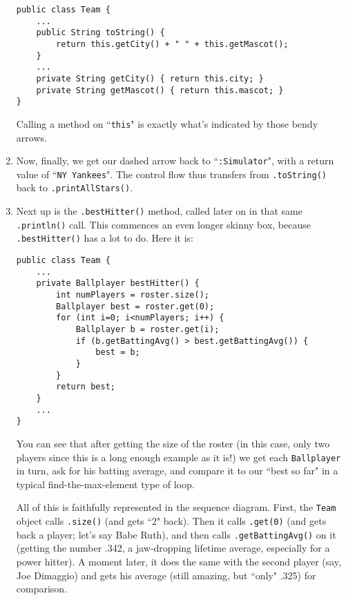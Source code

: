 \begin{enumerate}
\begin{Verbatim}[fontsize=\footnotesize,samepage=true,frame=single]
public class Team {
    ...
    public String toString() {
        return this.getCity() + " " + this.getMascot();
    }
    ...
    private String getCity() { return this.city; }
    private String getMascot() { return this.mascot; }
}
\end{Verbatim}

Calling a method on ``\texttt{this}" is exactly what's indicated by those
bendy arrows.

\item Now, finally, we get our dashed arrow back to ``\texttt{:Simulator}",
with a return value of ``\texttt{NY Yankees}". The control flow thus transfers
from \texttt{.toString()} back to \texttt{.printAllStars()}.

\item Next up is the \texttt{.bestHitter()} method, called later on in that
same \texttt{.println()} call. This commences an even longer skinny box,
because \texttt{.bestHitter()} has a lot to do. Here it is:

\begin{Verbatim}[fontsize=\scriptsize,samepage=true,frame=single]
public class Team {
    ...
    private Ballplayer bestHitter() {
        int numPlayers = roster.size();
        Ballplayer best = roster.get(0);
        for (int i=0; i<numPlayers; i++) {
            Ballplayer b = roster.get(i);
            if (b.getBattingAvg() > best.getBattingAvg()) {
                best = b;
            }
        }
        return best;
    }
    ...
}
\end{Verbatim}

You can see that after getting the size of the roster (in this case, only two
players since this is a long enough example as it is!) we get each
\texttt{Ballplayer} in turn, ask for his batting average, and compare it to
our ``best so far" in a typical find-the-max-element type of loop.

All of this is faithfully represented in the sequence diagram. First, the
\texttt{Team} object calls \texttt{.size()} (and gets ``2" back). Then it
calls \texttt{.get(0)} (and gets back a player; let's say Babe Ruth), and then
calls \texttt{.getBattingAvg()} on it (getting the number .342, a jaw-dropping
lifetime average, especially for a power hitter). A moment later, it does the
same with the second player (say, Joe Dimaggio) and gets his average (still
amazing, but ``only" .325) for comparison.


\end{enumerate}

